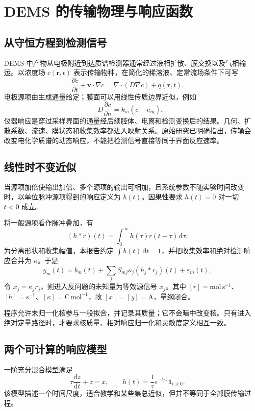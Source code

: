\chapter{DEMS 的传输物理与响应函数}
\section{从守恒方程到检测信号}
DEMS 中产物从电极附近到达质谱检测器通常经过液相扩散、膜交换以及气相输运。以浓度场 $c(\bm r,t)$ 表示传输物种，在简化的稀溶液、定常流场条件下可写
\begin{equation}
\frac{\partial c}{\partial t}+\bm v\cdot\nabla c
=\nabla\cdot(D\nabla c)+q(\bm r,t).
\end{equation}
电极源项由生成通量给定；膜面可以用线性传质边界近似，例如
\begin{equation}
-D\frac{\partial c}{\partial n}=k_m(c-c_{\mathrm{eq}}).
\end{equation}
仪器响应是穿过采样界面的通量经后续腔体、电离和检测变换后的结果。几何、扩散系数、流速、膜状态和收集效率都进入映射关系。原始研究已明确指出，传输会改变电化学质谱的动态响应，不能把检测信号直接等同于界面反应速率\cite{krempl2021}。

\section{线性时不变近似}
\begin{definition}[因果响应核]
当源项加倍使输出加倍、多个源项的输出可相加，且系统参数不随实验时间改变时，以单位脉冲源项得到的响应定义为 $h(t)$。因果性要求 $h(t)=0$ 对一切 $t<0$ 成立。
\end{definition}
将一般源项看作脉冲叠加，有
\begin{equation}
(h*r)(t)=\int_0^{\infty}h(\tau)r(t-\tau)\,\mathrm d\tau.
\end{equation}
为分离形状和收集幅值，本报告约定 $\int h(t)\,\mathrm dt=1$，并把收集效率和绝对检测响应合并为 $\kappa$。于是
\begin{equation}
 y_m(t)=b_m(t)+\sum_j S_{mj}\kappa_j(h_j*r_j)(t)+\varepsilon_m(t),\label{eq:demsfull}
\end{equation}
令 $x_j=\kappa_jr_j$，则进入反问题的未知量为等效源信号 $x_j$。其中 $[r]=\mathrm{mol\,s^{-1}}$、$[h]=\mathrm{s^{-1}}$、$[\kappa]=\mathrm{C\,mol^{-1}}$，故 $[x]=[y]=\mathrm A$，量纲闭合。

程序允许未归一化核参与一般拟合，并记录其质量；它不会暗中改变核。只有进入绝对定量路径时，才要求核质量、相对响应归一化和灵敏度定义相互一致。

\section{两个可计算的响应模型}
一阶充分混合模型满足
\begin{equation}
\tau\frac{\mathrm dz}{\mathrm dt}+z=x,
\qquad h(t)=\frac1\tau e^{-t/\tau}\mathbf1_{t\ge0}.
\end{equation}
该模型描述一个时间尺度，适合教学和某些集总近似，但并不等同于全部膜传输过程。

